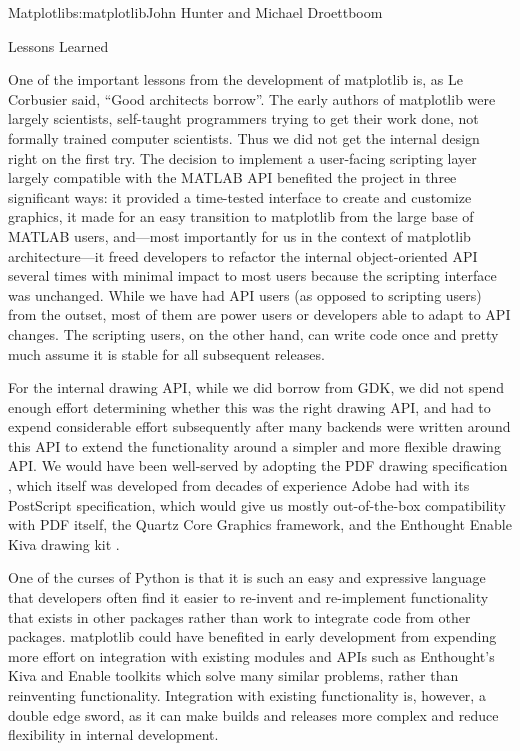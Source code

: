 \begin{aosachapter}{Matplotlib}{s:matplotlib}{John Hunter and Michael Droettboom}
\begin{aosasect1}{Lessons Learned}

One of the important lessons from the development of matplotlib is,
as Le Corbusier said, ``Good architects borrow''.  The early authors
of matplotlib were largely scientists, self-taught programmers
trying to get their work done, not formally trained computer
scientists. Thus we did not get the internal design right on the
first try. The decision to implement a user-facing scripting layer
largely compatible with the MATLAB API benefited the project in
three significant ways: it provided a time-tested interface to
create and customize graphics, it made for an easy transition to
matplotlib from the large base of MATLAB users, and---most importantly
for us in the context of matplotlib architecture---it freed
developers to refactor the internal object-oriented API several
times with minimal impact to most users because the scripting
interface was unchanged.  While we have had API users (as opposed to
scripting users) from the outset, most of them are power users or
developers able to adapt to API changes.  The scripting users, on
the other hand, can write code once and pretty much assume it is
stable for all subsequent releases.

For the internal drawing API, while we did borrow from GDK, we did not
spend enough effort determining whether this was the right drawing
API, and had to expend considerable effort subsequently after many
backends were written around this API to extend the functionality
around a simpler and more flexible drawing API.  We would have been
well-served by adopting the PDF drawing specification \cite{bib:pdf},
which itself was developed from decades of experience Adobe had with
its PostScript specification, which would give us mostly
out-of-the-box compatibility with PDF itself, the Quartz Core Graphics
framework, and the Enthought Enable Kiva drawing kit \cite{bib:kiva}.

One of the curses of Python is that it is such an easy and expressive
language that developers often find it easier to re-invent and
re-implement functionality that exists in other packages rather than
work to integrate code from other packages.  matplotlib could have
benefited in early development from expending more effort on
integration with existing modules and APIs such as Enthought's Kiva
and Enable toolkits which solve many similar problems, rather than
reinventing functionality.  Integration with existing functionality
is, however, a double edge sword, as it can make builds and releases
more complex and reduce flexibility in internal development.

\end{aosasect1}
\end{aosachapter}
